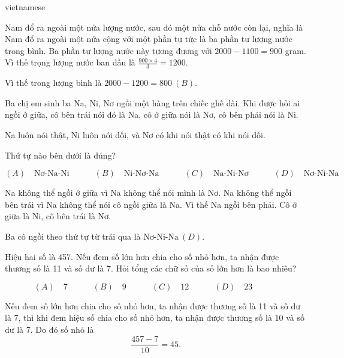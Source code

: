 \documentclass{article}
\begin{document}
\begin{otherlanguage*}{vietnamese}
\begin{soln}
    Nam đổ ra ngoài một nửa lượng nước, sau đó một nửa chỗ nước còn lại, nghĩa là Nam đổ ra ngoài một nửa cộng với một phần tư tức là ba phần tư lượng nước trong bình.
    Ba phần tư lượng nước này tương đương với $2000 - 1100 = 900$ gram. Vì thế trọng lượng nước ban đầu là $\frac{900 \times 4}{3} = 1200.$

    Vì thế trong lượng bình là $2000-1200 = \boxed{800\ (B).}$
\end{soln}

\bigbreak

\begin{problem*}[PI-2024-C-P4]
    \label{problem:pi-2024-c-p4}

    Ba chị em sinh ba Na, Ni, Nơ ngồi một hàng trên chiếc ghế dài.
    Khi được hỏi ai ngồi ở giữa, cô bên trái nói đó là Na, cô ở giữa nói là Nơ, cô bên phải nói là Ni.

    Na luôn nói thật, Ni luôn nói dối, và Nơ có khi nói thật có khi nói dối.

    Thứ tự nào bên dưới là đúng?

    \[
        (A) \quad \text{Nơ-Na-Ni} \qquad \quad
        (B) \quad \text{Ni-Nơ-Na} \qquad \quad
        (C) \quad \text{Na-Ni-Nơ} \qquad \quad
        (D) \quad \text{Nơ-Ni-Na} \qquad \quad
    \]
\end{problem*}

\begin{soln}
    Na không thể ngồi ở giữa vì Na không thể nói mình là Nơ.
    Na không thể ngồi bên trái vì Na không thể nói cô ngồi giữa là Na.
    Vì thế Na ngồi bên phải. Cô ở giữa là Ni, cô bên trái là Nơ.

    Ba cô ngồi theo thứ tự từ trái qua là $\boxed{\text{Nơ-Ni-Na}\ (D).}$
\end{soln}

\bigbreak

\begin{problem*}[PI-2024-C-P5]
    \label{problem:pi-2024-c-p5}

    Hiệu hai số là 457. Nếu đem số lớn hơn chia cho số nhỏ hơn, ta nhận được thương số là 11 và số dư là 7.
    Hỏi tổng các chữ số của số lớn hơn là bao nhiêu?

    \[
        (A) \quad 7 \qquad \quad
        (B) \quad 9 \qquad \quad
        (C) \quad 12 \qquad \quad
        (D) \quad 23 \qquad \quad
    \]
\end{problem*}

\begin{soln}
    Nếu đem số lớn hơn chia cho số nhỏ hơn, ta nhận được thương số là 11 và số dư là 7,
    thì khi đem hiệu số chia cho số nhỏ hơn, ta nhận được thương số là 10 và số dư là 7.
    Do đó số nhỏ là
    \[
        \frac{457 - 7}{10} = 45.
    \]


\end{soln}
\end{otherlanguage*}
\end{document}

